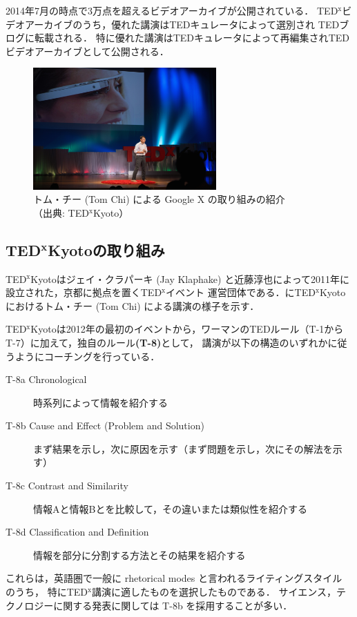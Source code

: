 \documentclass[submit,techreq,jkeyword,noauthor]{ipsj}
\newcommand{\TED}{\textrm{TED}}
\newcommand{\TEDx}{\TED${}^{\textrm{x}}$}
\newcommand{\TEDxKyoto}{\TEDx\-\textrm{Kyoto}}
\newcommand{\TEDtitle}{\textbf{TED}}
\newcommand{\TEDxtitle}{\TEDtitle${}^{\textbf{x}}$}
\newcommand{\TEDxKyototitle}{\TEDxtitle\textbf{Kyoto}}
\begin{document}
2014年7月の時点で3万点を超えるビデオアーカイブが公開されている．
\TEDx ビデオアーカイブのうち，優れた講演は\TED キュレータによって選別され \TED ブログに転載される．
特に優れた講演は\TED キュレータによって再編集され\TED ビデオアーカイブとして公開される．\cite{tedxtalksweb}

\begin{figure}[t]
\begin{center}
\includegraphics[width=7cm,clip]{tom_chi.png}
\end{center}
\caption{トム・チー (Tom Chi) による Google X の取り組みの紹介\\
（出典: \TEDxKyoto ）}
\label{fig:tomchi}
\end{figure}

\subsection{\TEDxKyototitle の取り組み}

\TEDxKyoto はジェイ・クラパーキ (Jay Klaphake) と近藤淳也によって2011年に設立された，京都に拠点を置く\TEDx イベント
運営団体である．に\TEDxKyoto におけるトム・チー (Tom Chi) による講演の様子を示す．

\TEDxKyoto は2012年の最初のイベントから，ワーマンの\TED ルール（T-1からT-7）に加えて，独自のルール\textbf{(T-8)}として，
講演が以下の構造のいずれかに従うようにコーチングを行っている．
\begin{description}
\item[T-8a Chronological] 時系列によって情報を紹介する
\item[T-8b Cause and Effect (Problem and Solution)] まず結果を示し，次に原因を示す（まず問題を示し，次にその解法を示す）
\item[T-8c Contrast and Similarity] 情報Aと情報Bとを比較して，その違いまたは類似性を紹介する
\item[T-8d Classification and Definition] 情報を部分に分割する方法とその結果を紹介する
\end{description}
これらは，英語圏で一般に rhetorical modes と言われるライティングスタイル \cite{cs} のうち，
特に\TEDx 講演に適したものを選択したものである．
サイエンス，テクノロジーに関する発表に関しては T-8b を採用することが多い．
\end{document}
